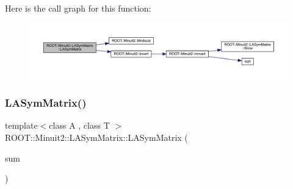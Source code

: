 Here is the call graph for this function\+:
\nopagebreak
\begin{figure}[H]
\begin{center}
\leavevmode
\includegraphics[width=350pt]{d3/d72/classROOT_1_1Minuit2_1_1LASymMatrix_a0089b4055d0d08767d7072657b6f87d5_cgraph}
\end{center}
\end{figure}
\mbox{\label{classROOT_1_1Minuit2_1_1LASymMatrix_a50ecd9916b1ca8941c767d16dbdb9b65}} 
\subsubsection{\texorpdfstring{LASymMatrix()}{LASymMatrix()}\hspace{0.1cm}{\footnotesize\ttfamily [18/20]}}
{\footnotesize\ttfamily template$<$class A , class T $>$ \\
R\+O\+O\+T\+::\+Minuit2\+::\+L\+A\+Sym\+Matrix\+::\+L\+A\+Sym\+Matrix (\begin{DoxyParamCaption}\item[{const \mbox{\hyperlink{classROOT_1_1Minuit2_1_1ABObj}{A\+B\+Obj}}$<$ \mbox{\hyperlink{classROOT_1_1Minuit2_1_1sym}{sym}}, \mbox{\hyperlink{classROOT_1_1Minuit2_1_1ABSum}{A\+B\+Sum}}$<$ \mbox{\hyperlink{classROOT_1_1Minuit2_1_1ABObj}{A\+B\+Obj}}$<$ \mbox{\hyperlink{classROOT_1_1Minuit2_1_1sym}{sym}}, \mbox{\hyperlink{classROOT_1_1Minuit2_1_1MatrixInverse}{Matrix\+Inverse}}$<$ \mbox{\hyperlink{classROOT_1_1Minuit2_1_1sym}{sym}}, \mbox{\hyperlink{classROOT_1_1Minuit2_1_1ABObj}{A\+B\+Obj}}$<$ \mbox{\hyperlink{classROOT_1_1Minuit2_1_1sym}{sym}}, \mbox{\hyperlink{classROOT_1_1Minuit2_1_1LASymMatrix}{L\+A\+Sym\+Matrix}}, T $>$, T $>$, T $>$, \mbox{\hyperlink{classROOT_1_1Minuit2_1_1ABObj}{A\+B\+Obj}}$<$ \mbox{\hyperlink{classROOT_1_1Minuit2_1_1sym}{sym}}, A, T $>$ $>$, T $>$ \&}]{sum }\end{DoxyParamCaption})\hspace{0.3cm}{\ttfamily [inline]}}

